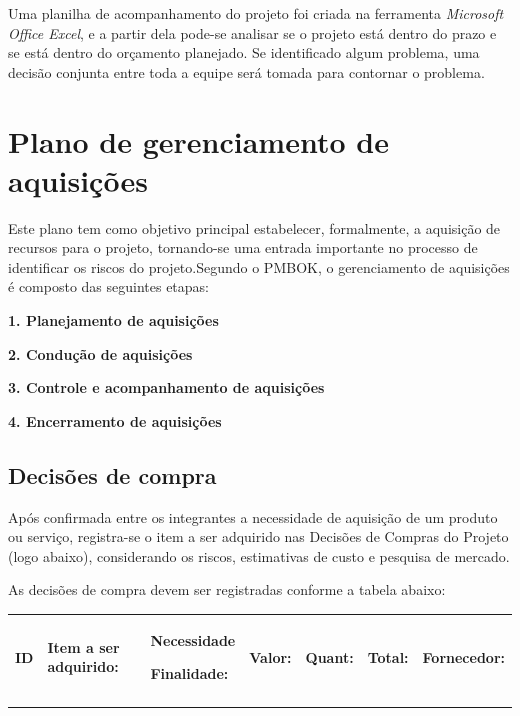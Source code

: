 Uma planilha de acompanhamento do projeto foi criada na ferramenta \textit{Microsoft Office Excel}, e a partir dela pode-se analisar se o projeto está dentro do prazo e se está dentro do orçamento planejado. Se identificado algum problema, uma decisão conjunta entre toda a equipe será tomada para contornar o problema.


\section{Plano de gerenciamento de aquisições}

Este plano tem como objetivo principal estabelecer, formalmente, a aquisição de recursos para o projeto, tornando-se uma entrada importante no processo de identificar os riscos do projeto.Segundo o PMBOK, o gerenciamento de aquisições é composto das seguintes etapas: 

\textbf{1. Planejamento de aquisições}

\textbf{2. Condução de aquisições}

\textbf{3. Controle e acompanhamento de aquisições}

\textbf{4. Encerramento de aquisições}


\subsection{Decisões de compra}

Após confirmada entre os integrantes a necessidade de aquisição de um produto ou serviço, registra-se o item a ser adquirido nas Decisões de Compras do Projeto (logo abaixo), considerando os riscos, estimativas de custo e pesquisa de mercado.

As decisões de compra devem ser registradas conforme a tabela abaixo:

\begin{table}[h]
 \centering
 {\renewcommand\arraystretch{1.25}
 \begin{tabular}{ l l l l l l l }
  \cline{1-1}\cline{2-2}\cline{3-3}\cline{4-4}\cline{5-5}\cline{6-6}\cline{7-7}  
    \multicolumn{1}{|p{1.233cm}|}{\textbf{ID}} &
    \multicolumn{1}{p{2.767cm}|}{\textbf{Item a ser adquirido:}} &
    \multicolumn{1}{p{2.633cm}|}{\textbf{Necessidade}  			

\textbf{Finalidade:}} &
    \multicolumn{1}{p{1.167cm}|}{\textbf{Valor:}} &
    \multicolumn{1}{p{1.367cm}|}{\textbf{Quant:}} &
    \multicolumn{1}{p{1.367cm}|}{\textbf{Total:}} &
    \multicolumn{1}{p{2.767cm}|}{\textbf{Fornecedor:}}
  \\  
  \cline{1-1}\cline{2-2}\cline{3-3}\cline{4-4}\cline{5-5}\cline{6-6}\cline{7-7}  
    \multicolumn{1}{|p{1.233cm}|}{ } &
    \multicolumn{1}{p{2.767cm}|}{ } &
    \multicolumn{1}{p{2.633cm}|}{ } &
    \multicolumn{1}{p{1.167cm}|}{ } &
    \multicolumn{1}{p{1.367cm}|}{ } &
    \multicolumn{1}{p{1.367cm}|}{ } &
    \multicolumn{1}{p{2.767cm}|}{ }
  \\  
  \hline

 \end{tabular} }
\end{table}


